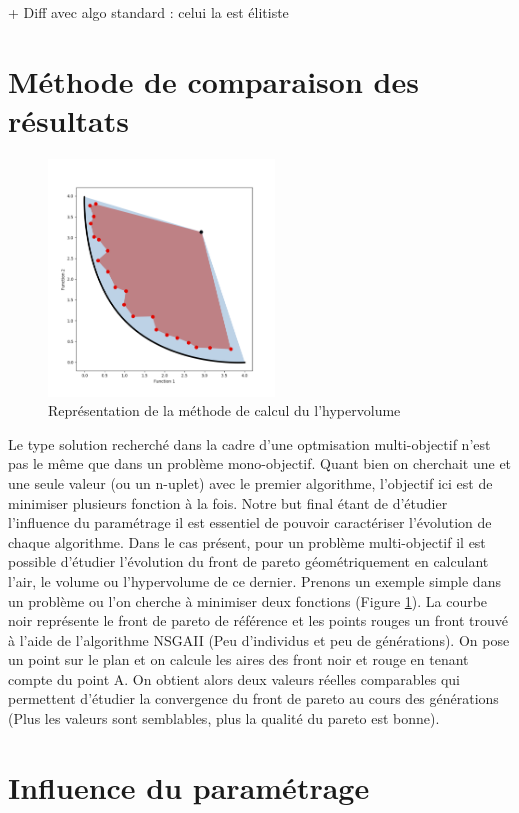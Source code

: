 \documentclass[12pt]{report}
\begin{document}
      + Diff avec algo standard : celui la est élitiste

    \section{Méthode de comparaison des résultats}
      \begin{figure}
        \centering
        \includegraphics[width=6cm]{img/hypervolume.png}
        \caption{Représentation de la méthode de calcul du l'hypervolume}
        \label{hypervolume}
      \end{figure}
      Le type solution recherché dans la cadre d'une optmisation multi-objectif n'est pas le même que dans un problème mono-objectif. Quant bien on cherchait une et une seule valeur (ou un n-uplet) avec le premier algorithme, l'objectif ici est de minimiser plusieurs fonction à la fois. Notre but final étant de d'étudier l'influence du paramétrage il est essentiel de pouvoir caractériser l'évolution de chaque algorithme. Dans le cas présent, pour un problème multi-objectif il est possible d'étudier l'évolution du front de pareto géométriquement en calculant l'air, le volume ou l'hypervolume de ce dernier.
      Prenons un exemple simple dans un problème ou l'on cherche à minimiser deux fonctions (Figure \ref{hypervolume}). La courbe noir représente le front de pareto de référence et les points rouges un front trouvé à l'aide de l'algorithme NSGAII (Peu d'individus et peu de générations). On pose un point sur le plan et on calcule les aires des front noir et rouge en tenant compte du point A. On obtient alors deux valeurs réelles comparables qui permettent d'étudier la convergence du front de pareto au cours des générations (Plus les valeurs sont semblables, plus la qualité du pareto est bonne).
    \section{Influence du paramétrage}
\end{document}
